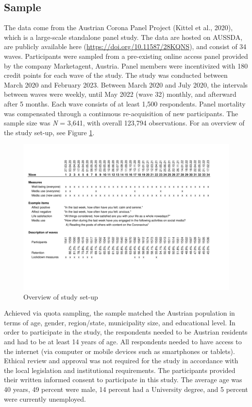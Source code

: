 \documentclass[
  man,mask,floatsintext]{apa7}
\begin{document}
\hypertarget{sample}{%
\subsection{Sample}\label{sample}}

The data come from the Austrian Corona Panel Project (Kittel et al., 2020), which is a large-scale standalone panel study.
The data are hosted on AUSSDA, are publicly available here (\url{https://doi.org/10.11587/28KQNS}), and consist of 34 waves.
Participants were sampled from a pre-existing online access panel provided by the company Marketagent, Austria.
Panel members were incentivized with 180 credit points for each wave of the study.
The study was conducted between March 2020 and February 2023.
Between March 2020 and July 2020, the intervals between waves were weekly, until May 2022 (wave 32) monthly, and afterward after 5 months.
Each wave consists of at least 1,500 respondents.
Panel mortality was compensated through a continuous re-acquisition of new participants.
The sample size was \emph{N} = 3,641, with overall 123,794 observations.
For an overview of the study set-up, see Figure \ref{fig:study-desc}.

\begin{figure}
\includegraphics[width=1\textwidth]{figures/fig_study_description} \caption{Overview of study set-up}\label{fig:study-desc}
\end{figure}

Achieved via quota sampling, the sample matched the Austrian population in terms of age, gender, region/state, municipality size, and educational level.
In order to participate in the study, the respondents needed to be Austrian residents and had to be at least 14 years of age.
All respondents needed to have access to the internet (via computer or mobile devices such as smartphones or tablets).
Ethical review and approval was not required for the study in accordance with the local legislation and institutional requirements.
The participants provided their written informed consent to participate in this study.
The average age was 40 years, 49 percent were male, 14 percent had a University degree, and 5 percent were currently unemployed.
\end{document}
